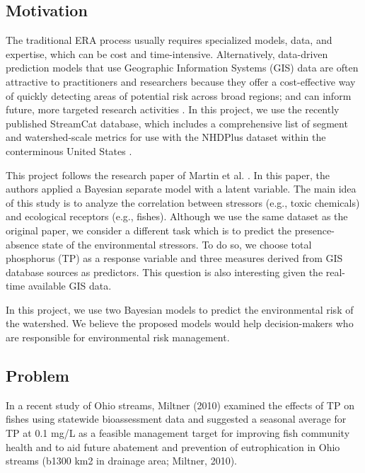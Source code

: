 \documentclass[a4paper]{artikel3}
\begin{document}
\subsection{Motivation}
The traditional ERA process usually requires specialized models, data, and expertise, which can be cost and time-intensive. Alternatively, data-driven prediction models that use Geographic Information Systems (GIS) data are often attractive to practitioners and researchers because they offer a cost-effective way of quickly detecting areas of potential risk across broad regions; and can inform future, more targeted research activities \cite{martin2018empirically}. In this project, we use the recently published StreamCat database, which includes a comprehensive list of segment and watershed-scale metrics for use with the NHDPlus dataset within the conterminous United States \cite{hill2016stream}. 

This project follows the research paper of Martin et al. \cite{martin2018empirically}. In this paper, the authors applied a Bayesian separate model with a latent variable. The main idea of this study is to analyze the correlation between stressors (e.g., toxic chemicals) and ecological receptors (e.g., ﬁshes). Although we use the same dataset as the original paper, we consider a different task which is to predict the presence-absence state of the environmental stressors. To do so, we choose total phosphorus (TP) as a response variable and three measures derived from GIS database sources as predictors. This question is also interesting given the real-time available GIS data. 

In this project, we use two Bayesian models to predict the environmental risk of the watershed. We believe the proposed models would help decision-makers who are responsible for environmental risk management.


\subsection{Problem}
In a recent study of Ohio streams, Miltner (2010) examined the effects of TP on ﬁshes using statewide bioassessment data and suggested a seasonal average for TP at 0.1 mg/L as a feasible management target for improving ﬁsh community health and to aid future abatement and prevention of eutrophication in Ohio streams (b1300 km2 in drainage area; Miltner, 2010).
\end{document}

